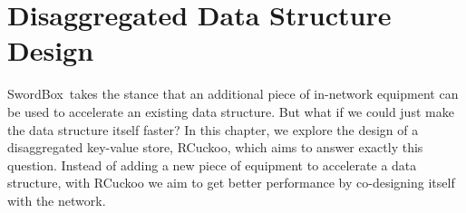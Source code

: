 \documentclass[12pt]{ucsddissertation}
\newcommand{\sword}{SwordBox}
\begin{document}






\chapter{Disaggregated Data Structure Design}
\label{chap:rcuckoo}


\sword\ takes the stance that an additional piece of in-network equipment can be used to accelerate
an existing data structure. But what if we could just make the data structure itself faster? In this
chapter, we explore the design of a disaggregated key-value store, RCuckoo, which aims to answer
exactly this question. Instead of adding a new piece of equipment to accelerate a data structure,
with RCuckoo we aim to get better performance by co-designing itself with the network.
\end{document}
